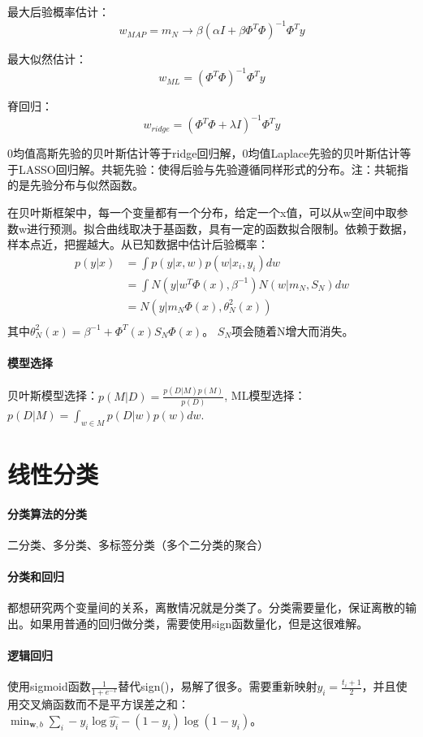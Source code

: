 最大后验概率估计：$$w_{MAP}=m_N \to \beta(\alpha I+\beta \Phi^T\Phi)^{-1}\Phi^Ty$$

最大似然估计：
$$w_{ML}=(\Phi^T\Phi)^{-1}\Phi^Ty$$

脊回归：
$$w_{ridge}=(\Phi^T\Phi+\lambda I)^{-1}\Phi^Ty$$

0均值高斯先验的贝叶斯估计等于ridge回归解，0均值Laplace先验的贝叶斯估计等于LASSO回归解。共轭先验：使得后验与先验遵循同样形式的分布。注：共轭指的是先验分布与似然函数。

在贝叶斯框架中，每一个变量都有一个分布，给定一个x值，可以从w空间中取参数w进行预测。拟合曲线取决于基函数，具有一定的函数拟合限制。依赖于数据，样本点近，把握越大。从已知数据中估计后验概率：
$$
\begin{aligned}
    p(y|x) &=\int p(y|x,w)p(w|x_i,y_i)dw \\
    &=\int N(y|w^T\Phi(x),\beta^{-1})N(w|m_N,S_N)dw \\
    &=N(y|m_N\Phi(x),\theta_N^2(x)) \\
\end{aligned}
$$
其中$\theta_N^2(x)=\beta^{-1}+\Phi^T(x)S_N\Phi(x)$。 $S_N$项会随着N增大而消失。

\paragraph{模型选择} 
贝叶斯模型选择：$p(M|D) = \frac{p(D|M)p(M)}{p(D)}$,
ML模型选择：$p(D|M)=\int_{w\in M} p(D|w)p(w)dw$.

\section{线性分类}

\paragraph{分类算法的分类}二分类、多分类、多标签分类（多个二分类的聚合）

\paragraph{分类和回归} 都想研究两个变量间的关系，离散情况就是分类了。分类需要量化，保证离散的输出。如果用普通的回归做分类，需要使用sign函数量化，但是这很难解。

\paragraph{逻辑回归} 使用sigmoid函数$\frac{1}{1+e^{-x}}$替代sign()，易解了很多。需要重新映射$y_i = \frac{t_i + 1}{2}$，并且使用交叉熵函数而不是平方误差之和：$\min_{\bm w, b} \sum_i - y_i\log\hat{y_i} - (1-y_i)\log(1-y_i)。$

